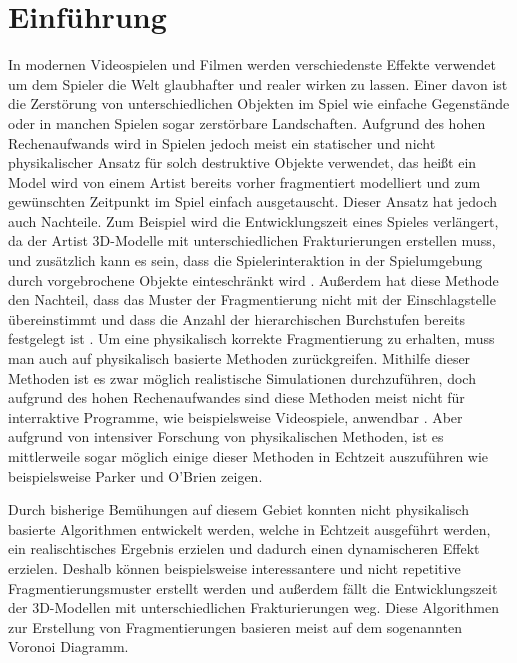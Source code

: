 \chapter{Einführung}

In modernen Videospielen und Filmen werden verschiedenste Effekte verwendet um dem Spieler die Welt glaubhafter und realer wirken zu lassen.
Einer davon ist die Zerstörung von unterschiedlichen Objekten im Spiel wie einfache Gegenstände oder in manchen Spielen sogar zerstörbare Landschaften.
Aufgrund des hohen Rechenaufwands wird in Spielen jedoch meist ein statischer und nicht physikalischer Ansatz für solch destruktive Objekte verwendet, 
das heißt ein Model wird von einem Artist bereits vorher fragmentiert modelliert und zum gewünschten Zeitpunkt im Spiel einfach ausgetauscht. 
Dieser Ansatz hat jedoch auch Nachteile. Zum Beispiel wird die Entwicklungszeit eines Spieles verlängert, da der Artist 3D-Modelle mit 
unterschiedlichen Frakturierungen erstellen muss, und zusätzlich kann es sein, dass die Spielerinteraktion in der Spielumgebung durch 
vorgebrochene Objekte einteschränkt wird \cite{Najim.DynamicFracturing}.
Außerdem hat diese Methode den Nachteil, dass das Muster der Fragmentierung nicht mit der Einschlagstelle übereinstimmt und dass die Anzahl der 
hierarchischen Burchstufen bereits festgelegt ist \cite{Mueller.RealTimeDynamicFractureVACD}. Um eine physikalisch korrekte Fragmentierung zu erhalten, muss man 
auch auf physikalisch basierte Methoden zurückgreifen. Mithilfe dieser Methoden ist es zwar möglich realistische Simulationen durchzuführen, doch aufgrund des hohen
Rechenaufwandes sind diese Methoden meist nicht für interraktive Programme, wie beispielsweise Videospiele, anwendbar \cite{Torres.FractureModelingSurvey}.
Aber aufgrund von intensiver Forschung von physikalischen Methoden, ist es mittlerweile sogar möglich einige dieser Methoden in Echtzeit auszuführen wie beispielsweise
Parker und O'Brien \cite{Parker.Real-TimeDeformation} zeigen.

Durch bisherige Bemühungen auf diesem Gebiet konnten nicht physikalisch basierte Algorithmen entwickelt werden, welche in Echtzeit ausgeführt werden, ein 
realischtisches Ergebnis erzielen und dadurch einen dynamischeren Effekt erzielen. 
Deshalb können beispielsweise interessantere und nicht repetitive Fragmentierungsmuster erstellt werden und außerdem fällt die 
Entwicklungszeit der 3D-Modellen mit unterschiedlichen Frakturierungen weg.
Diese Algorithmen zur Erstellung von Fragmentierungen basieren meist auf dem sogenannten Voronoi Diagramm.\\